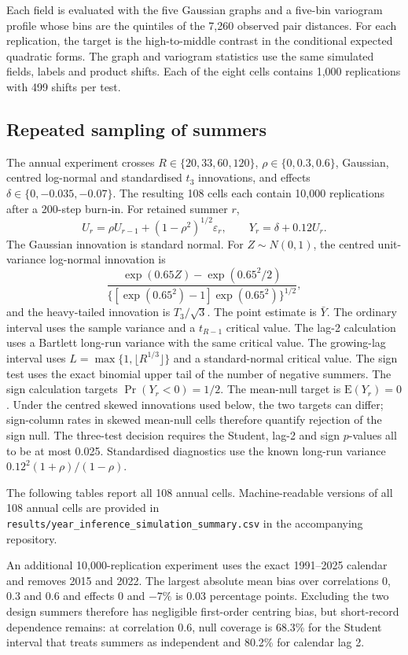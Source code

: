 \documentclass[namedate,webpdf,modern,mediumone]{oup-authoring-template}
\theoremstyle{thmstyleone}
\begin{document}
Each field is evaluated with the five Gaussian graphs and a five-bin
variogram profile whose bins are the quintiles of the 7,260 observed pair
distances. For each replication, the target is the high-to-middle contrast in
the conditional expected quadratic forms. The graph and variogram statistics
use the same simulated fields, labels and product shifts. Each of the eight
cells contains 1,000 replications with 499 shifts per test.



\subsection{Repeated sampling of summers}

The annual experiment crosses
$R\in\{20,33,60,120\}$, $\rho\in\{0,0.3,0.6\}$, Gaussian, centred log-normal
and standardised $t_3$ innovations, and effects
$\delta\in\{0,-0.035,-0.07\}$. The resulting 108 cells each contain 10,000
replications after a 200-step burn-in. For retained summer $r$,
\[
 U_r=\rho U_{r-1}+(1-\rho^2)^{1/2}\varepsilon_r,
 \qquad Y_r=\delta+0.12U_r.
\]
The Gaussian innovation is standard normal. For $Z\sim N(0,1)$, the centred
unit-variance log-normal innovation is
\[
 \frac{\exp(0.65Z)-\exp(0.65^2/2)}
 {\{[\exp(0.65^2)-1]\exp(0.65^2)\}^{1/2}},
\]
and the heavy-tailed innovation is $T_3/\sqrt{3}$. The point estimate is
$\bar Y$. The ordinary interval uses the sample variance and a
$t_{R-1}$ critical value. The lag-2 calculation uses a Bartlett long-run
variance with the same critical value. The growing-lag interval uses
$L=\max\{1,\lfloor R^{1/3}\rfloor\}$ and a standard-normal critical value.
The sign test uses the exact binomial upper tail of the number of negative
summers. The sign calculation targets $\Pr(Y_r<0)=1/2$. The mean-null target
is $\mathrm E(Y_r)=0$. Under the centred skewed innovations used below, the
two targets can differ; sign-column rates in skewed mean-null cells therefore
quantify rejection of the sign null. The three-test
decision requires the Student, lag-2 and sign $p$-values all to be at most
0.025. Standardised diagnostics use the known
long-run variance $0.12^2(1+\rho)/(1-\rho)$.

The following tables report all 108 annual cells.
Machine-readable versions of all 108 annual cells are provided in
\texttt{results/year\_inference\_simulation\_summary.csv} in the accompanying
repository.

An additional 10,000-replication experiment uses the exact 1991--2025 calendar
and removes 2015 and 2022. The largest absolute mean bias over correlations
0, 0.3 and 0.6 and effects 0 and $-7\%$ is 0.03 percentage points. Excluding
the two design summers therefore has negligible first-order centring bias,
but short-record dependence remains: at correlation 0.6, null coverage is
68.3\% for the Student interval that treats summers as independent and 80.2\%
for calendar lag 2.
\end{document}

